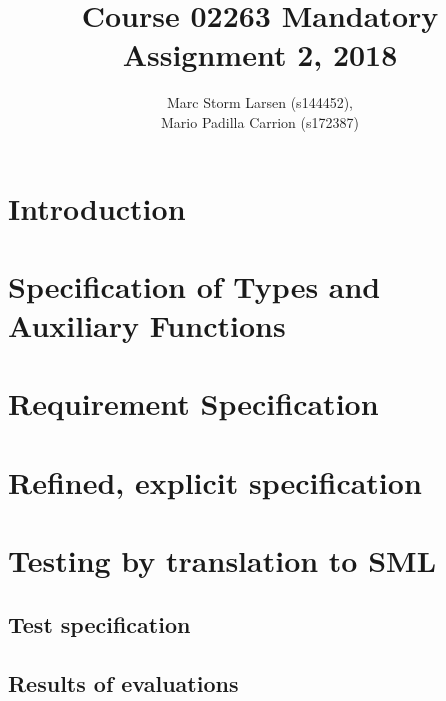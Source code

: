 \documentclass[a4]{article}
\title{Course 02263 Mandatory Assignment 2, 2018}
\author{Marc Storm Larsen (s144452),\\ 
        Mario Padilla Carrion (s172387)}
\begin{document}
\maketitle

\tableofcontents
\newpage

\section{Introduction}

\section{Specification of Types and Auxiliary Functions}

  

\section{Requirement Specification}

  

\section{Refined, explicit specification}

  

\section{Testing by translation to SML}

\subsection{Test specification}



\subsection{Results of evaluations}
\end{document}
